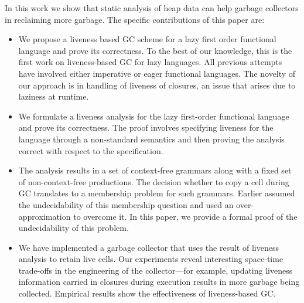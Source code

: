 \documentclass[9pt,preprint,letter,nonatbib]{sigplanconf}
\newcommand{\added}[1]{#1}
\begin{document}
In  this work  we show  that  static analysis  of heap  data can  help
garbage  collectors   in  reclaiming   more  garbage.    The  specific
contributions of this paper are:
\added{
\begin{itemize}
\item We  propose a liveness  based GC scheme  for a lazy  first order
  functional language and  prove its correctness.  To the  best of our
  knowledge,  this is  the first  work on  liveness-based GC  for lazy
  languages.       All      previous      attempts~\cite{shaham01heap,
    ran.shaham-sas03,          shaham02estimating,         asati14lgc,
    karkare06effectiveness} have  involved either imperative  or eager
  functional languages.  The novelty of our approach is in handling of
  liveness  of closures,  an  issue  that arises  due  to laziness  at
  runtime.

\item  We  formulate a  liveness  analysis  for the  lazy  first-order
  functional language  and prove  its correctness. The  proof involves
  specifying  liveness   for  the  language  through   a  non-standard
  semantics and then proving the  analysis correct with respect to the
  specification.

\item The  analysis results  in a set  of context-free  grammars along
  with  a fixed  set  of non-context-free  productions.  The  decision
  whether to copy a cell during  GC translates to a membership problem
  for  such  grammars.  Earlier  assumed  the  undecidability of  this
  membership question  and used an over-approximation  to overcome it.
  In this  paper, we provide a  formal proof of the  undecidability of
  this problem.

\item We have implemented a garbage collector that uses the result of
  liveness  analysis to  retain  live cells.   Our experiments  reveal
  interesting  space-time   trade-offs  in  the  engineering   of  the
  collector---for  example, updating  liveness information  carried in
  closures during  execution results in more  garbage being collected.
  Empirical results  show the effectiveness of  liveness-based GC.
\end{itemize}
}
\end{document}
